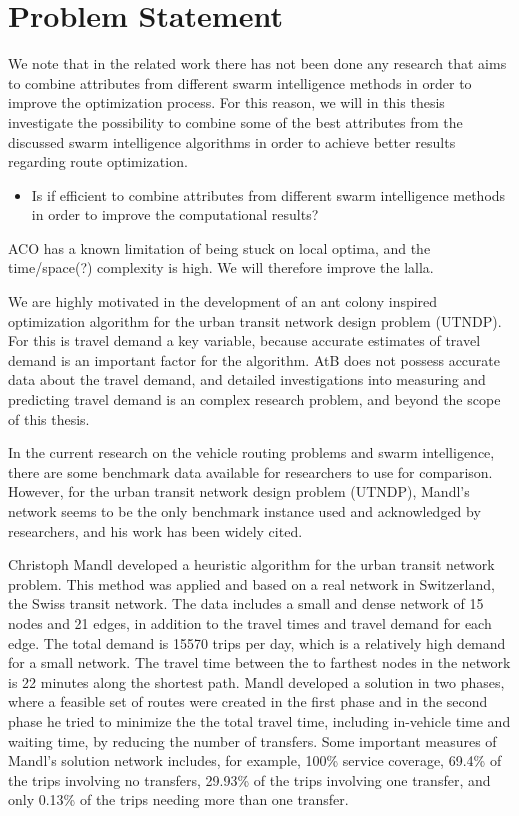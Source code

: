 \section{Problem Statement} 

We note that in the related work there has not been done any research that aims to combine attributes from different swarm intelligence methods in order to improve the optimization process. For this reason, we will in this thesis investigate the possibility to combine some of the best attributes from the discussed swarm intelligence algorithms in order to achieve better results regarding route optimization. 
\begin{itemize}
\item Is if efficient to combine attributes from different swarm intelligence methods in order to improve the computational results?
\end{itemize}

ACO has a known limitation of being stuck on local optima, and the time/space(?) complexity is high. We will therefore improve the lalla.

We are highly motivated in the development of an ant colony inspired optimization algorithm for the urban transit network design problem (UTNDP). For this is travel demand a key variable, because accurate estimates of travel demand is an important factor for the algorithm. AtB does not possess accurate data about the travel demand, and detailed investigations into measuring and predicting travel demand is an complex research problem, and beyond the scope of this thesis. 

In the current research on the vehicle routing problems and swarm intelligence, there are some benchmark data available for researchers to use for comparison. However, for the urban transit network design problem (UTNDP), Mandl's network seems to be the only benchmark instance used and acknowledged by researchers, and his work has been widely cited.%

Christoph Mandl \citep{mandl79} developed a heuristic algorithm for the urban transit network problem. This method was applied and based on a real network in Switzerland, the Swiss transit network\citep{mandl80}. The data includes a small and dense network of 15 nodes and 21 edges, in addition to the travel times and travel demand for each edge. The total demand is 15570 trips per day, which is a relatively high demand for a small network. The travel time between the to farthest nodes in the network is 22 minutes along the shortest path. Mandl developed a solution in two phases, where a feasible set of routes were created in the first phase and in the second phase he tried to minimize the the total travel time, including in-vehicle time and waiting time, by reducing the number of transfers. Some important measures of Mandl's solution network includes, for example, 100\% service coverage, 69.4\% of the trips involving no transfers, 29.93\% of the trips involving one transfer, and only 0.13\% of the trips needing more than one transfer.

